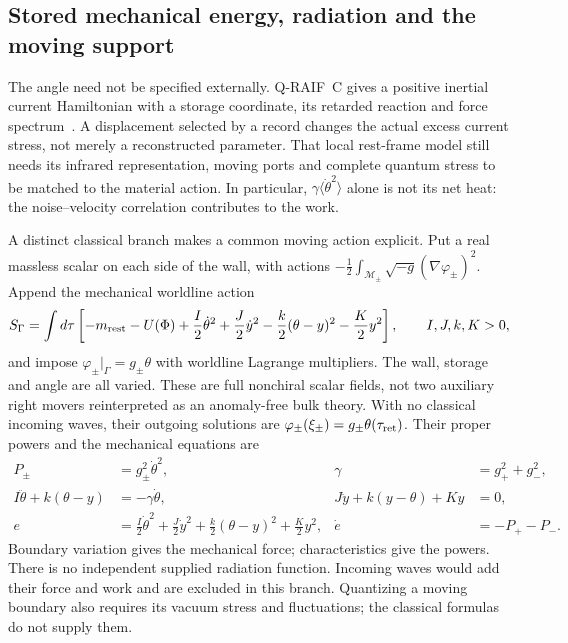 \subsection{Stored mechanical energy, radiation and the moving support}
\label{sec:inertial-scalar-support}

The angle need not be specified externally. Q-RAIF~C gives a positive
inertial current Hamiltonian with a storage coordinate, its retarded
reaction and force spectrum~\cite[Section on an inertial contact]{QRC}.
A displacement selected by a record changes the actual excess current
stress, not merely a reconstructed parameter. That local rest-frame
model still needs its infrared representation, moving ports and complete
quantum stress to be matched to the material action. In particular,
$\gamma\langle\dot\theta^2\rangle$ alone is not its net heat: the
noise--velocity correlation contributes to the work.

A distinct classical branch makes a common moving action explicit.
Put a real massless scalar on each side of the wall, with actions
$-\frac12\int_{\mathcal M_\pm}\sqrt{-g}(\nabla\varphi_\pm)^2$.
Append the mechanical worldline action
\begin{equation}\label{eq:scalar-mechanical-action}
 S_\Gamma=\int d\tau\left[-m_{\rm rest}-U(\Phi)
       +\frac I2\dot\theta^2+\frac J2\dot y^2
       -\frac k2(\theta-y)^2-\frac K2 y^2\right],
 \qquad I,J,k,K>0,
\end{equation}
and impose $\varphi_\pm|_\Gamma=g_\pm\theta$ with worldline Lagrange
multipliers. The wall, storage and angle are all varied. These are full
nonchiral scalar fields, not two auxiliary right movers reinterpreted as
an anomaly-free bulk theory. With no classical incoming waves, their
outgoing solutions are $\varphi_\pm(\xi_\pm)=g_\pm\theta(\tau_{\rm ret})$.
Their proper powers and the mechanical equations are
\begin{align}\label{eq:scalar-mechanical-source}
 P_\pm&=g_\pm^2\dot\theta^2,&
 \gamma&=g_+^2+g_-^2,\\
 I\ddot\theta+k(\theta-y)&=-\gamma\dot\theta,&
 J\ddot y+k(y-\theta)+Ky&=0,\nonumber\\
 e&=\tfrac I2\dot\theta^2+\tfrac J2\dot y^2
              +\tfrac k2(\theta-y)^2+\tfrac K2y^2,&
 \dot e&=-P_+-P_- .\nonumber
\end{align}
Boundary variation gives the mechanical force; characteristics give
the powers. There is no independent supplied radiation function.
Incoming waves would add their force and work and are excluded in
this branch. Quantizing a moving boundary also requires its vacuum
stress and fluctuations; the classical formulas do not supply them.


